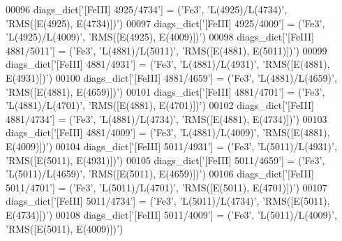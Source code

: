 \begin{DoxyCode}
00096 diags\_dict[\textcolor{stringliteral}{'[FeIII] 4925/4734'}] = (\textcolor{stringliteral}{'Fe3'}, \textcolor{stringliteral}{'L(4925)/L(4734)'}, \textcolor{stringliteral}{'RMS([E(4925), E(4734)])'})
00097 diags\_dict[\textcolor{stringliteral}{'[FeIII] 4925/4009'}] = (\textcolor{stringliteral}{'Fe3'}, \textcolor{stringliteral}{'L(4925)/L(4009)'}, \textcolor{stringliteral}{'RMS([E(4925), E(4009)])'})
00098 diags\_dict[\textcolor{stringliteral}{'[FeIII] 4881/5011'}] = (\textcolor{stringliteral}{'Fe3'}, \textcolor{stringliteral}{'L(4881)/L(5011)'}, \textcolor{stringliteral}{'RMS([E(4881), E(5011)])'})
00099 diags\_dict[\textcolor{stringliteral}{'[FeIII] 4881/4931'}] = (\textcolor{stringliteral}{'Fe3'}, \textcolor{stringliteral}{'L(4881)/L(4931)'}, \textcolor{stringliteral}{'RMS([E(4881), E(4931)])'})
00100 diags\_dict[\textcolor{stringliteral}{'[FeIII] 4881/4659'}] = (\textcolor{stringliteral}{'Fe3'}, \textcolor{stringliteral}{'L(4881)/L(4659)'}, \textcolor{stringliteral}{'RMS([E(4881), E(4659)])'})
00101 diags\_dict[\textcolor{stringliteral}{'[FeIII] 4881/4701'}] = (\textcolor{stringliteral}{'Fe3'}, \textcolor{stringliteral}{'L(4881)/L(4701)'}, \textcolor{stringliteral}{'RMS([E(4881), E(4701)])'})
00102 diags\_dict[\textcolor{stringliteral}{'[FeIII] 4881/4734'}] = (\textcolor{stringliteral}{'Fe3'}, \textcolor{stringliteral}{'L(4881)/L(4734)'}, \textcolor{stringliteral}{'RMS([E(4881), E(4734)])'})
00103 diags\_dict[\textcolor{stringliteral}{'[FeIII] 4881/4009'}] = (\textcolor{stringliteral}{'Fe3'}, \textcolor{stringliteral}{'L(4881)/L(4009)'}, \textcolor{stringliteral}{'RMS([E(4881), E(4009)])'})
00104 diags\_dict[\textcolor{stringliteral}{'[FeIII] 5011/4931'}] = (\textcolor{stringliteral}{'Fe3'}, \textcolor{stringliteral}{'L(5011)/L(4931)'}, \textcolor{stringliteral}{'RMS([E(5011), E(4931)])'})
00105 diags\_dict[\textcolor{stringliteral}{'[FeIII] 5011/4659'}] = (\textcolor{stringliteral}{'Fe3'}, \textcolor{stringliteral}{'L(5011)/L(4659)'}, \textcolor{stringliteral}{'RMS([E(5011), E(4659)])'})
00106 diags\_dict[\textcolor{stringliteral}{'[FeIII] 5011/4701'}] = (\textcolor{stringliteral}{'Fe3'}, \textcolor{stringliteral}{'L(5011)/L(4701)'}, \textcolor{stringliteral}{'RMS([E(5011), E(4701)])'})
00107 diags\_dict[\textcolor{stringliteral}{'[FeIII] 5011/4734'}] = (\textcolor{stringliteral}{'Fe3'}, \textcolor{stringliteral}{'L(5011)/L(4734)'}, \textcolor{stringliteral}{'RMS([E(5011), E(4734)])'})
00108 diags\_dict[\textcolor{stringliteral}{'[FeIII] 5011/4009'}] = (\textcolor{stringliteral}{'Fe3'}, \textcolor{stringliteral}{'L(5011)/L(4009)'}, \textcolor{stringliteral}{'RMS([E(5011), E(4009)])'})

\end{DoxyCode}
